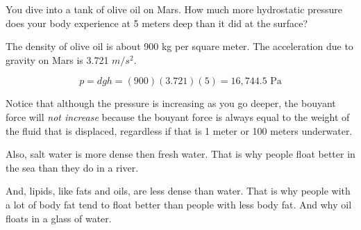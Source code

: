 \begin{Exercise}[title={Hydrostatic Pressure}, label=mars_pressure]

  You dive into a tank of olive oil on Mars. How much more
  hydrostatic pressure does your body experience at 5 meters deep than
  it did at the surface?

  The density of olive oil is about 900 kg per square meter. The
  acceleration due to gravity on Mars is 3.721 $m/s^2$.
  
\end{Exercise}
\begin{Answer}[ref=mars_pressure]
$$p = d g h = (900)(3.721)(5) = 16,744.5 \text{ Pa}$$
\end{Answer}

Notice that although the pressure is increasing as you go deeper, the
bouyant force will \emph{not increase} because the bouyant force is always equal
to the weight of the fluid that is displaced, regardless if that is 1
meter or 100 meters underwater.

Also, salt water is more dense then fresh water. That is why people float
better in the sea than they do in a river.

And, lipids, like fats and oils, are less dense than water. That is why
people with a lot of body fat tend to float better than people with
less body fat. And why oil floats in a glass of water.
